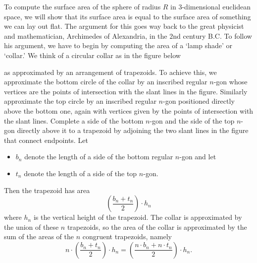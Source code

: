 \documentclass{ximera}
\begin{document}
To compute the surface area of the sphere of radius $R$ in $3$-dimensional
euclidean space, we will show that its surface area is equal to the surface
area of something we can lay out flat. The argument for this goes way back to
the great physicist and mathematician, Archimedes of Alexandria, in the $2$nd
century B.C. To follow his argument, we have to begin by computing the area of
a `lamp shade' or `collar.' We think of a circular collar as in the figure
below%
\begin{image}
\end{image}
as approximated by an arrangement of trapezoids. To achieve this, we
approximate the bottom circle of the collar by an inscribed regular $n$-gon
whose vertices are the points of intersection with the slant lines in the
figure. Similarly approximate the top circle by an inscribed regular $n$-gon
positioned directly above the bottom one, again with vertices given by the
points of intersection with the slant lines. Complete a side of the bottom
$n$-gon and the side of the top $n$-gon directly above it to a trapezoid by
adjoining the two slant lines in the figure that connect endpoints. Let
\begin{itemize}
\item $b_{n}$ denote the length of a side of the bottom regular
  $n$-gon and let 
\item $t_{n}$ denote the length of a side of the top $n$-gon. 
\end{itemize}
Then the trapezoid has area
\[
\left(  \frac{b_{n}+t_{n}}{2}\right)  \cdot h_{n}%
\]
where $h_{n}$ is the vertical height of the trapezoid. The collar is
approximated by the union of these $n$ trapezoids, so the area of the collar
is approximated by the sum of the areas of the $n$ congruent trapezoids,
namely%
\[
n\cdot \left(  \frac{b_{n}+t_{n}}{2}\right)
\cdot h_{n}=\left(  \frac{n\cdot %
b_{n}+n\cdot t_{n}}{2}\right) \cdot h_{n}.
\]
\end{document}
